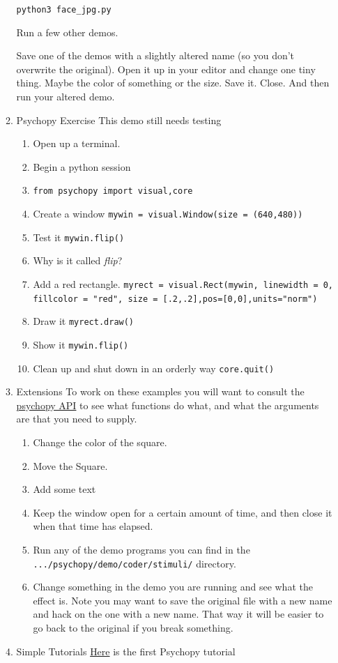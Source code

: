 \documentclass{article}
\begin{document}
\begin{enumerate}
\begin{enumerate}
\texttt{python3 face\_jpg.py}

Run a few other demos.

Save one of the demos with a slightly altered name (so you don't overwrite the original). Open it up in your editor and change one tiny thing. Maybe the color of something or the size. Save it. Close. And then run your altered demo. 
\item Psychopy Exercise
\label{sec:org1fef509}
This demo still needs testing
\begin{enumerate}
\item Open up a terminal.
\item Begin a python session
\item \texttt{from psychopy import visual,core}
\item Create a window
\texttt{mywin = visual.Window(size = (640,480))}
\item Test it
\texttt{mywin.flip()}
\item Why is it called \emph{flip}?
\item Add a red rectangle.
\texttt{myrect = visual.Rect(mywin, linewidth = 0, fillcolor = "red", size = [.2,.2],pos=[0,0],units="norm")}
\item Draw it
\texttt{myrect.draw()}
\item Show it
\texttt{mywin.flip()}
\item Clean up and shut down in an orderly way
\texttt{core.quit()}
\end{enumerate}
\item Extensions
\label{sec:org3869839}
To work on these examples you will want to consult the \href{https://www.psychopy.org/api/api.html}{psychopy API} to see what functions do what, and what the arguments are that you need to supply. 
\begin{enumerate}
\item Change the color of the square.
\item Move the Square.
\item Add some text
\item Keep the window open for a certain amount of time, and then close it when that time has elapsed.
\item Run any of the demo programs you can find in the \texttt{.../psychopy/demo/coder/stimuli/} directory.
\item Change something in the demo you are running and see what the effect is.
Note you may want to save the original file with a new name and hack on the one with a new name. That way it will be easier to go back to the original if you break something.
\end{enumerate}
\item Simple Tutorials
\label{sec:orgac3a93e}
\href{https://www.psychopy.org/coder/tutorial1.html}{Here} is the first Psychopy tutorial 


\end{enumerate}
\end{enumerate}
\end{document}
